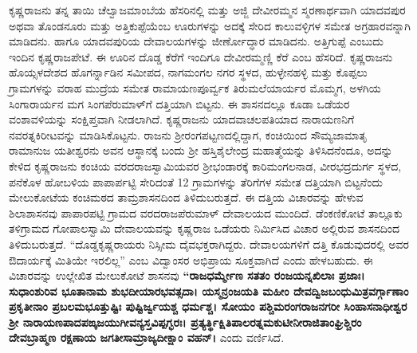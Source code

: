 ಕೃಷ್ಣರಾಜನು ತನ್ನ ತಾಯಿ ಚೆಲ್ವಾಜಮಾಂಬೆಯ ಹೆಸರಿನಲ್ಲಿ ಮತ್ತು ಅಜ್ಜಿ ದೇವೀರಮ್ಮನ ಸ್ಮರಣಾರ್ಥವಾಗಿ ಯಾದವಪುರ ಅಥವಾ ತೊಂಡನೂರು ಮತ್ತು ಅತ್ತಿಕುಪ್ಪೆಯೆಂಬ ಊರುಗಳನ್ನು ಅದಕ್ಕೆ ಸೇರಿದ ಕಾಲುವಳ್ಳಿಗಳ ಸಮೇತ ಅಗ್ರಹಾರವನ್ನಾಗಿ ಮಾಡಿದನು. ಹಾಗೂ ಯಾದವಪುರಿಯ ದೇವಾಲಯಗಳನ್ನು ಜೀರ್ಣೋದ್ಧಾರ ಮಾಡಿದನು. ಅತ್ತಿಗುಪ್ಪೆ ಎಂಬುದು ಇಂದಿನ ಕೃಷ್ಣರಾಜಪೇಟೆ. ಈ ಊರಿನ ದೊಡ್ಡ ಕೆರೆಗೆ ಇಂದಿಗೂ ದೇವೀರಮ್ಮಣ್ಣಿ ಕೆರೆ ಎಂಬ ಹೆಸರಿದೆ. ಕೃಷ್ಣರಾಜನು ಹೊಯ್ಸಳದೇಶದ ಹೊಗರ್ನ್ನಾಡಿನ ಸಮೀಪದ, ನಾಗಮಂಗಲ ನಗರ ಸ್ಥಳದ, ಹುಳ್ಳೇನಹಳ್ಳಿ ಮತ್ತು ಕೊಪ್ಪಲು ಗ್ರಾಮಗಳನ್ನು ವರಾಹ ಮುದ್ರೆಯ ಸಮೇತ ರಾಮಾಯಣಪೂರ್ವ್ವಕ ತಿರುಮಲೆಯಾರ್ಯರ ಮೊಮ್ಮಗ, ಅಳಗಿಯ ಸಿಂಗಾರಾರ್ಯನ ಮಗ ಸಿಂಗಪೆರುಮಾಳ್​ಗೆ ದತ್ತಿಯಾಗಿ ಬಿಟ್ಟನು. ಈ ಶಾಸನದಲ್ಲೂ ಕೂಡಾ ಒಡೆಯರ ವಂಶಾವಳಿಯನ್ನು ಸಂಕ್ಷಿಪ್ತವಾಗಿ ನೀಡಲಾಗಿದೆ. ಕೃಷ್ಣರಾಜನು ಯಾದವಾಚಲಪತಿಯಾದ ನಾರಾಯಣನಿಗೆ ನವರತ್ನಕಿರೀಟವನ್ನು ಮಾಡಿಸಿಕೊಟ್ಟನು. ರಾಜನು ಶ‍್ರೀರಂಗಪಟ್ಟಣದಲ್ಲಿದ್ದಾಗ, ಕಂಚಿಯಿಂದ ಸೌಮ್ಯಜಾಮಾತೃ ರಾಮಾನುಜ ಯತೀಶ್ವರನು ಅವನ ಆಸ್ಥಾನಕ್ಕೆ ಬಂದು ಶ‍್ರೀ ಹಸ್ತಿಶೈಲೇಂದ್ರ ಮಹಾತ್ಮೆಯನ್ನು ತಿಳಿಸಿದನೆಂದೂ, ಅದನ್ನು ಕೇಳಿದ ಕೃಷ್ಣರಾಜನು ಕಂಚಿಯ ವರದರಾಜಸ್ವಾಮಿಯವರ ಶ‍್ರೀಭಂಡಾರಕ್ಕೆ ಕಾರಿಮಂಗಲನಾಡ, ವೀರಭದ್ರದುರ್ಗ ಸ್ಥಳದ, ಪನೆಕೊಳ ಹೋಬಳಿಯ ಪಾಪಾರ್ಪಟ್ಟಿ ಸೇರಿದಂತೆ 12 ಗ್ರಾಮಗಳನ್ನು ತೆರಿಗೆಗಳ ಸಮೇತ ದತ್ತಿಯಾಗಿ ಬಿಟ್ಟನೆಂದು ಮೇಲುಕೋಟೆಯ ಕಂಚಿಮಠದ ತಾಮ್ರಶಾಸನದಿಂದ ತಿಳಿದು\-ಬರುತ್ತದೆ. ಈ ದತ್ತಿಯ ವಿಚಾರವನ್ನು ಹೇಳುವ ಶಿಲಾಶಾಸನವು ಪಾಪಾರಪಟ್ಟಿ ಗ್ರಾಮದ ವರದರಾಜಪೆರುಮಾಳ್​ ದೇವಾಲಯದ ಮುಂದಿದೆ. ಡೆಂಕಣಿಕೋಟೆ ತಾಲ್ಲೂಕು ತಳಿಗ್ರಾಮದ ಗೋಪಾಲಸ್ವಾಮಿ ದೇವಾಲಯವನ್ನು ಕೃಷ್ಣರಾಜ ಒಡೆಯರು ನಿರ್ಮಿಸಿದ ವಿಚಾರ ಅಲ್ಲಿರುವ ಶಾಸನದಿಂದ ತಿಳಿದುಬರುತ್ತದೆ. “ದೊಡ್ಡಕೃಷ್ಣರಾಯರು ನಿಸ್ಸೀಮ ದೈವಭಕ್ತ\-ರಾಗಿದ್ದರು. ದೇವಾಲಯಗಳಿಗೆ ದತ್ತಿ ಕೊಡುವುದರಲ್ಲಿ ಅವರ ಔದಾರ್ಯಕ್ಕೆ ಮಿತಿಯೇ ಇರಲಿಲ್ಲ” ಎಂಬ ವಿದ್ವಾಂಸರ ಅಭಿಪ್ರಾಯ ಸೂಕ್ತವಾಗಿದೆ ಎಂದು ಹೇಳಬಹುದು. ಈ ವಿಚಾರವನ್ನು ಉಲ್ಲೇಖಿತ ಮೇಲುಕೋಟೆ ಶಾಸನವು \textbf{“ರಾಜಧರ್ಮ್ಮೇಣ ಸತತಂ ರಂಜಯನ್ನಖಿಲಾಃ ಪ್ರಜಾಃ। ಸುಧಾಂಶುರಿವ ಭೂತಾನಾಮ ಶುಭದೀಯಾರಭವತ್ಸದಾ। ಯಸ್ಮನ್ರಂಜಯತಿ ಮಹೀಂ ದೇವದ್ವಿಜಬಂಧುಮಿತ್ರವರ್ಗ್ಗಾಣಾಂ ಪ್ರಕೃತೀನಾಂ ಪ್ರಬಲಮಭೂತ್ತುಷ್ಟಿಃ ಪುಷ್ಟಿರ್ಜ್ವಯಶ್ಚ ಧರ್ಮಶ್ಚ। ಸೋಯಂ ಪಶ್ಚಿಮರಂಗ\-ರಾಜನಗರೀ ಸಿಂಹಾಸನಾಧೀಶ್ವರ ಶ‍್ರೀ ನಾರಾಯಣಪಾದಪಙ್ಕಜಯುಗೀವನ್ಯಸ್ತವಿಪ್ಪಗ್ಭರಃ। ಪ್ರತ್ಯರ್ತ್ಥಿಕ್ಷಿತಿಪಾಲರತ್ನಮಕುಟೀ\-ನೀರಾಜಿತಾಂಘ್ರಿಶ್ಚಿರಂ ದೇವಬ್ರಾಹ್ಮಣ ರಕ್ಷಣಾಯ ಜಗತೀಸಾಮ್ರಾಜ್ಯದೀಕ್ಷಾಂ ವಹನ್​। } ಎಂದು ವರ್ಣಿಸಿದೆ.


